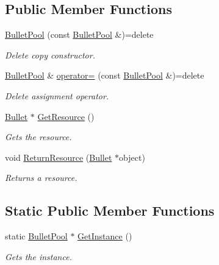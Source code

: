 \subsection*{Public Member Functions}
\begin{DoxyCompactItemize}
\item 
\hyperlink{class_bullet_pool_a13ca9f11d97405c0033612c389bfc06b}{Bullet\-Pool} (const \hyperlink{class_bullet_pool}{Bullet\-Pool} \&)=delete
\begin{DoxyCompactList}\small\item\em Delete copy constructor. \end{DoxyCompactList}\item 
\hyperlink{class_bullet_pool}{Bullet\-Pool} \& \hyperlink{class_bullet_pool_a808fcff0d6b8e4fa0b6954a0af689b79}{operator=} (const \hyperlink{class_bullet_pool}{Bullet\-Pool} \&)=delete
\begin{DoxyCompactList}\small\item\em Delete assignment operator. \end{DoxyCompactList}\item 
\hyperlink{class_bullet}{Bullet} $\ast$ \hyperlink{class_bullet_pool_ae80aa07016b9635d7637ea5796393d29}{Get\-Resource} ()
\begin{DoxyCompactList}\small\item\em Gets the resource. \end{DoxyCompactList}\item 
void \hyperlink{class_bullet_pool_aa821f65e3b2a2845471ba094a683560d}{Return\-Resource} (\hyperlink{class_bullet}{Bullet} $\ast$object)
\begin{DoxyCompactList}\small\item\em Returns a resource. \end{DoxyCompactList}\end{DoxyCompactItemize}
\subsection*{Static Public Member Functions}
\begin{DoxyCompactItemize}
\item 
static \hyperlink{class_bullet_pool}{Bullet\-Pool} $\ast$ \hyperlink{class_bullet_pool_a47b62aed3b35862ba203a5d0647b8d1a}{Get\-Instance} ()
\begin{DoxyCompactList}\small\item\em Gets the instance. \end{DoxyCompactList}\end{DoxyCompactItemize}

